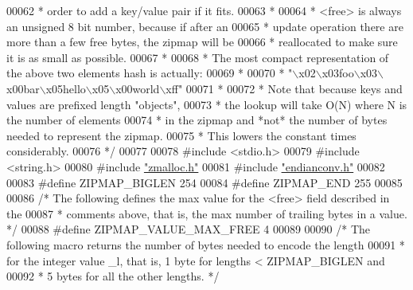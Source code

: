 \begin{DoxyCode}
00062 \textcolor{comment}{ * order to add a key/value pair if it fits.}
00063 \textcolor{comment}{ *}
00064 \textcolor{comment}{ * <free> is always an unsigned 8 bit number, because if after an}
00065 \textcolor{comment}{ * update operation there are more than a few free bytes, the zipmap will be}
00066 \textcolor{comment}{ * reallocated to make sure it is as small as possible.}
00067 \textcolor{comment}{ *}
00068 \textcolor{comment}{ * The most compact representation of the above two elements hash is actually:}
00069 \textcolor{comment}{ *}
00070 \textcolor{comment}{ * "\(\backslash\)x02\(\backslash\)x03foo\(\backslash\)x03\(\backslash\)x00bar\(\backslash\)x05hello\(\backslash\)x05\(\backslash\)x00world\(\backslash\)xff"}
00071 \textcolor{comment}{ *}
00072 \textcolor{comment}{ * Note that because keys and values are prefixed length "objects",}
00073 \textcolor{comment}{ * the lookup will take O(N) where N is the number of elements}
00074 \textcolor{comment}{ * in the zipmap and *not* the number of bytes needed to represent the zipmap.}
00075 \textcolor{comment}{ * This lowers the constant times considerably.}
00076 \textcolor{comment}{ */}
00077 
00078 \textcolor{preprocessor}{#}\textcolor{preprocessor}{include} \textcolor{preprocessor}{<}\textcolor{preprocessor}{stdio}\textcolor{preprocessor}{.}\textcolor{preprocessor}{h}\textcolor{preprocessor}{>}
00079 \textcolor{preprocessor}{#}\textcolor{preprocessor}{include} \textcolor{preprocessor}{<}\textcolor{preprocessor}{string}\textcolor{preprocessor}{.}\textcolor{preprocessor}{h}\textcolor{preprocessor}{>}
00080 \textcolor{preprocessor}{#}\textcolor{preprocessor}{include} \hyperlink{zmalloc_8h}{"zmalloc.h"}
00081 \textcolor{preprocessor}{#}\textcolor{preprocessor}{include} \hyperlink{endianconv_8h}{"endianconv.h"}
00082 
00083 \textcolor{preprocessor}{#}\textcolor{preprocessor}{define} \textcolor{preprocessor}{ZIPMAP\_BIGLEN} 254
00084 \textcolor{preprocessor}{#}\textcolor{preprocessor}{define} \textcolor{preprocessor}{ZIPMAP\_END} 255
00085 
00086 \textcolor{comment}{/* The following defines the max value for the <free> field described in the}
00087 \textcolor{comment}{ * comments above, that is, the max number of trailing bytes in a value. */}
00088 \textcolor{preprocessor}{#}\textcolor{preprocessor}{define} \textcolor{preprocessor}{ZIPMAP\_VALUE\_MAX\_FREE} 4
00089 
00090 \textcolor{comment}{/* The following macro returns the number of bytes needed to encode the length}
00091 \textcolor{comment}{ * for the integer value \_l, that is, 1 byte for lengths < ZIPMAP\_BIGLEN and}
00092 \textcolor{comment}{ * 5 bytes for all the other lengths. */}

\end{DoxyCode}

